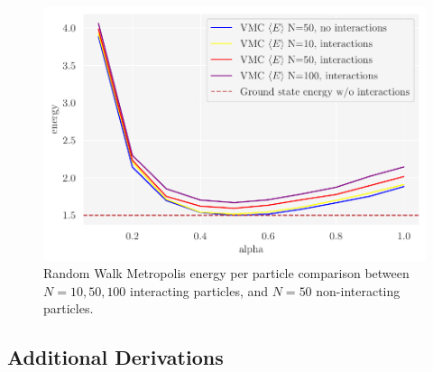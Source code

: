 \begin{figure}[H]
\begin{center}\includegraphics[scale=1.0]{latex/figures/grid_search_analytical_w_interactions_all_N.pdf}
\end{center}
\caption{Random Walk Metropolis energy per particle comparison between $N=10, 50, 100$ interacting particles, and $N=50$ non-interacting particles.}
\label{fig:comparisons_interactions_plot}
\end{figure}


\FloatBarrier

\subsection{Additional Derivations}\label{app:additional_derivations}

